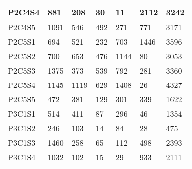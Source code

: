 \begin{longtable}{lllllll}
\multicolumn{1}{|l|}{P2C4S4} & \multicolumn{1}{l|}{881} & \multicolumn{1}{l|}{208} & \multicolumn{1}{l|}{30} & \multicolumn{1}{l|}{11} & \multicolumn{1}{l|}{2112} & \multicolumn{1}{l|}{3242} \\ \hline
\multicolumn{1}{|l|}{P2C4S5} & \multicolumn{1}{l|}{1091} & \multicolumn{1}{l|}{546} & \multicolumn{1}{l|}{492} & \multicolumn{1}{l|}{271} & \multicolumn{1}{l|}{771} & \multicolumn{1}{l|}{3171} \\ \hline
\multicolumn{1}{|l|}{P2C5S1} & \multicolumn{1}{l|}{694} & \multicolumn{1}{l|}{521} & \multicolumn{1}{l|}{232} & \multicolumn{1}{l|}{703} & \multicolumn{1}{l|}{1446} & \multicolumn{1}{l|}{3596} \\ \hline
\multicolumn{1}{|l|}{P2C5S2} & \multicolumn{1}{l|}{700} & \multicolumn{1}{l|}{653} & \multicolumn{1}{l|}{476} & \multicolumn{1}{l|}{1144} & \multicolumn{1}{l|}{80} & \multicolumn{1}{l|}{3053} \\ \hline
\multicolumn{1}{|l|}{P2C5S3} & \multicolumn{1}{l|}{1375} & \multicolumn{1}{l|}{373} & \multicolumn{1}{l|}{539} & \multicolumn{1}{l|}{792} & \multicolumn{1}{l|}{281} & \multicolumn{1}{l|}{3360} \\ \hline
\multicolumn{1}{|l|}{P2C5S4} & \multicolumn{1}{l|}{1145} & \multicolumn{1}{l|}{1119} & \multicolumn{1}{l|}{629} & \multicolumn{1}{l|}{1408} & \multicolumn{1}{l|}{26} & \multicolumn{1}{l|}{4327} \\ \hline
\multicolumn{1}{|l|}{P2C5S5} & \multicolumn{1}{l|}{472} & \multicolumn{1}{l|}{381} & \multicolumn{1}{l|}{129} & \multicolumn{1}{l|}{301} & \multicolumn{1}{l|}{339} & \multicolumn{1}{l|}{1622} \\ \hline
\multicolumn{1}{|l|}{P3C1S1} & \multicolumn{1}{l|}{514} & \multicolumn{1}{l|}{411} & \multicolumn{1}{l|}{87} & \multicolumn{1}{l|}{296} & \multicolumn{1}{l|}{46} & \multicolumn{1}{l|}{1354} \\ \hline
\multicolumn{1}{|l|}{P3C1S2} & \multicolumn{1}{l|}{246} & \multicolumn{1}{l|}{103} & \multicolumn{1}{l|}{14} & \multicolumn{1}{l|}{84} & \multicolumn{1}{l|}{28} & \multicolumn{1}{l|}{475} \\ \hline
\multicolumn{1}{|l|}{P3C1S3} & \multicolumn{1}{l|}{1460} & \multicolumn{1}{l|}{258} & \multicolumn{1}{l|}{65} & \multicolumn{1}{l|}{112} & \multicolumn{1}{l|}{498} & \multicolumn{1}{l|}{2393} \\ \hline
\multicolumn{1}{|l|}{P3C1S4} & \multicolumn{1}{l|}{1032} & \multicolumn{1}{l|}{102} & \multicolumn{1}{l|}{15} & \multicolumn{1}{l|}{29} & \multicolumn{1}{l|}{933} & \multicolumn{1}{l|}{2111} \\ \hline

\end{longtable}
